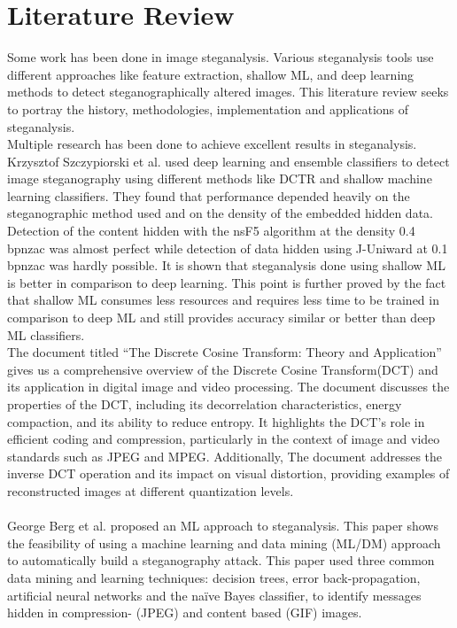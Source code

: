 \chapter{Literature Review}
Some work has been done in image steganalysis. Various steganalysis tools use different approaches like feature extraction, shallow ML, and deep learning methods to detect steganographically altered images. This literature review seeks to portray the history, methodologies, implementation and applications of steganalysis.\\
Multiple research has been done to achieve excellent results in steganalysis. Krzysztof Szczypiorski et al.\cite{1} used deep learning and ensemble classifiers to detect image steganography using different methods like DCTR and shallow machine learning classifiers. They found that performance depended heavily on the steganographic method used and on the density of the embedded hidden data. Detection of the content hidden with the nsF5 algorithm at the density 0.4 bpnzac was almost perfect while detection of data hidden using J-Uniward at 0.1 bpnzac was hardly possible. It is shown that steganalysis done using shallow ML is better in comparison to deep learning. This point is further proved by the fact that shallow ML consumes less resources and requires less time to be trained in comparison to deep ML and still provides accuracy similar or better than deep ML classifiers. \\
The document titled ``The Discrete Cosine Transform: Theory and Application''\cite{4} gives us a comprehensive overview of the Discrete Cosine Transform(DCT) and its application in digital image and video processing. The document discusses the properties of the DCT, including its decorrelation characteristics, energy compaction, and its ability to reduce entropy. It highlights the DCT's role in efficient coding and compression, particularly in the context of image and video standards such as JPEG and MPEG. Additionally, The document addresses the inverse DCT operation and its impact on visual distortion, providing examples of reconstructed images at different quantization levels.\\
\\George Berg et al.\cite{2} proposed an ML approach to steganalysis. This paper shows the feasibility of using a machine learning and data mining (ML/DM) approach to automatically build a steganography attack. This paper used three common data mining and learning techniques: decision trees, error back-propagation, artificial neural networks and the naïve Bayes classifier, to identify messages hidden in compression- (JPEG) and content based (GIF) images.\\
